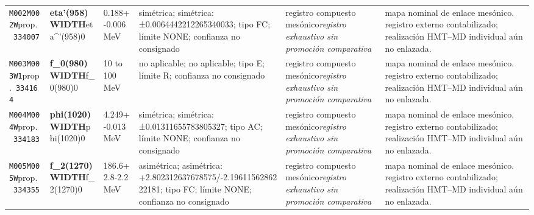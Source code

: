 \begin{landscape}
\begin{longtable}{L{1.85cm}L{4.45cm}L{2.35cm}L{4.05cm}L{3.35cm}L{7.15cm}}
\texttt{M002}\newline \texttt{M002W}\newline prop.\ \texttt{334007} & \textbf{eta'(958) WIDTH}\newline eta\textasciicircum{}'(958)0 & 0.188+-0.006\,MeV & simétrica; simétrica: ±0.0064442212265340033; tipo FC; límite NONE; confianza no consignado & registro compuesto mesónico\newline \emph{registro exhaustivo sin promoción comparativa} & mapa nominal de enlace mesónico. registro externo contabilizado; realización HMT--MD individual aún no enlazada. \\
\texttt{M003}\newline \texttt{M003W1}\newline prop.\ \texttt{334164} & \textbf{f\_\allowbreak{}0(980) WIDTH}\newline f\_\allowbreak{}0(980)0 & 10 to 100\,MeV & no aplicable; no aplicable; tipo E; límite R; confianza no consignado & registro compuesto mesónico\newline \emph{registro exhaustivo sin promoción comparativa} & mapa nominal de enlace mesónico. registro externo contabilizado; realización HMT--MD individual aún no enlazada. \\
\texttt{M004}\newline \texttt{M004W}\newline prop.\ \texttt{334183} & \textbf{phi(1020) WIDTH}\newline phi(1020)0 & 4.249+-0.013\,MeV & simétrica; simétrica: ±0.01311655783805327; tipo AC; límite NONE; confianza no consignado & registro compuesto mesónico\newline \emph{registro exhaustivo sin promoción comparativa} & mapa nominal de enlace mesónico. registro externo contabilizado; realización HMT--MD individual aún no enlazada. \\
\texttt{M005}\newline \texttt{M005W}\newline prop.\ \texttt{334355} & \textbf{f\_\allowbreak{}2(1270) WIDTH}\newline f\_\allowbreak{}2(1270)0 & 186.6+2.8-2.2\,MeV & asimétrica; asimétrica: +2.802312637678575/-2.1961156286222181; tipo FC; límite NONE; confianza no consignado & registro compuesto mesónico\newline \emph{registro exhaustivo sin promoción comparativa} & mapa nominal de enlace mesónico. registro externo contabilizado; realización HMT--MD individual aún no enlazada. \\

\end{longtable}
\end{landscape}
